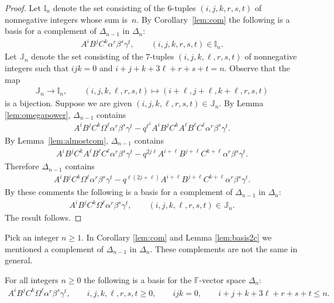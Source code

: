 \begin{proof}
Let $\mathbb I_n$ denote the set consisting of the 6-tuples
$(i,j,k,r,s,t)$ of nonnegative integers whose sum is~$n$.
By Corollary~\ref{lem:com} the
following
is a basis for a complement of
$\Delta_{n-1}$ in $\Delta_n$:
\begin{gather*}
A^iB^jC^k\alpha^r\beta^s\gamma^t, \qquad
(i,j,k,r,s,t) \in {\mathbb I}_n.
\end{gather*}
Let $\mathbb J_n$ denote the set consisting of the 7-tuples
$(i,j,k,\ell,r,s,t)$ of nonnegative integers such that
$ijk=0$ and
$i+j+k+3\ell+r+s+t = n$.
Observe that the map
\begin{gather*}
\mathbb J_n  \to  \mathbb I_n,
\qquad
(i,j,k,\ell,r,s,t)  \mapsto   (i+\ell,j+\ell,k+\ell,r,s,t)
\end{gather*}
is a bijection.
Suppose we are given $(i,j,k,\ell,r,s,t) \in \mathbb J_n$.
By
Lemma \ref{lem:omegapower},
$\Delta_{n-1}$ contains
\begin{gather*}
A^iB^jC^k\Omega^\ell \alpha^r \beta^s \gamma^t -
q^{\ell^2} A^iB^jC^k A^\ell B^\ell C^\ell \alpha^r \beta^s \gamma^t.
\end{gather*}
By Lemma~\ref{lem:almostcom},  $\Delta_{n-1}$ contains
\begin{gather*}
A^iB^jC^k A^\ell B^\ell C^\ell \alpha^r \beta^s \gamma^t
-
q^{2j \ell} A^{i+\ell}B^{j+\ell}C^{k+\ell}  \alpha^r \beta^s \gamma^t.
\end{gather*}
Therefore $\Delta_{n-1}$ contains
\begin{gather*}
A^iB^jC^k\Omega^\ell \alpha^r \beta^s \gamma^t -
q^{\ell(2j+ \ell)} A^{i+\ell}B^{j+\ell}C^{k+\ell}  \alpha^r \beta^s \gamma^t.
\end{gather*}
By these comments the following is a basis for a complement of
$\Delta_{n-1}$ in $\Delta_n$:
\begin{gather*}
A^iB^jC^k\Omega^\ell \alpha^r\beta^s\gamma^t, \qquad
(i,j,k,\ell,r,s,t) \in \mathbb J_n.
\end{gather*}
The result follows.
\end{proof}

\begin{Note}
Pick an integer $n \geq 1$.
In
Corollary
\ref{lem:com} and
Lemma
\ref{lem:basis2c}
we mentioned a
complement of $\Delta_{n-1}$ in $\Delta_n$. These
complements are not the same
in general.
\end{Note}


\begin{Proposition}
\label{lem:basis2n}
For all integers $n\geq 0$
the following is a basis
for
the $\mathbb F$-vector space
$\Delta_n$:
\begin{gather*}
 A^iB^jC^k\Omega^\ell \alpha^r \beta^s \gamma^t, \qquad
i,j,k,\ell, r,s,t\geq 0,
\qquad ijk=0,
 \qquad
i+j+k+3\ell+r+s+t \leq  n.
\end{gather*}
\end{Proposition}

